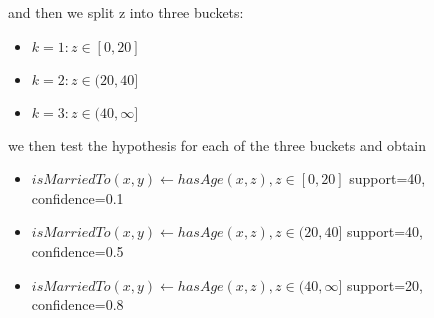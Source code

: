 and then we split z into three buckets:

\begin{itemize}
 \item \begin{math} k=1: z\in[0,20]\end{math}
 \item \begin{math} k=2: z\in(20,40]\end{math}
 \item \begin{math} k=3: z\in(40,\infty]\end{math}
\end{itemize}

we then test the hypothesis for each of the three buckets and obtain

\begin{itemize}

 \item \begin{math}isMarriedTo(x,y) \leftarrow hasAge(x,z), z\in[0,20]\end{math}	
    \newline support=40, confidence=0.1
 \item \begin{math}isMarriedTo(x,y) \leftarrow hasAge(x,z), z\in(20,40]\end{math}	
    \newline support=40, confidence=0.5
 \item \begin{math}isMarriedTo(x,y) \leftarrow hasAge(x,z), z\in(40,\infty]\end{math}
    \newline support=20, confidence=0.8

\end{itemize}

